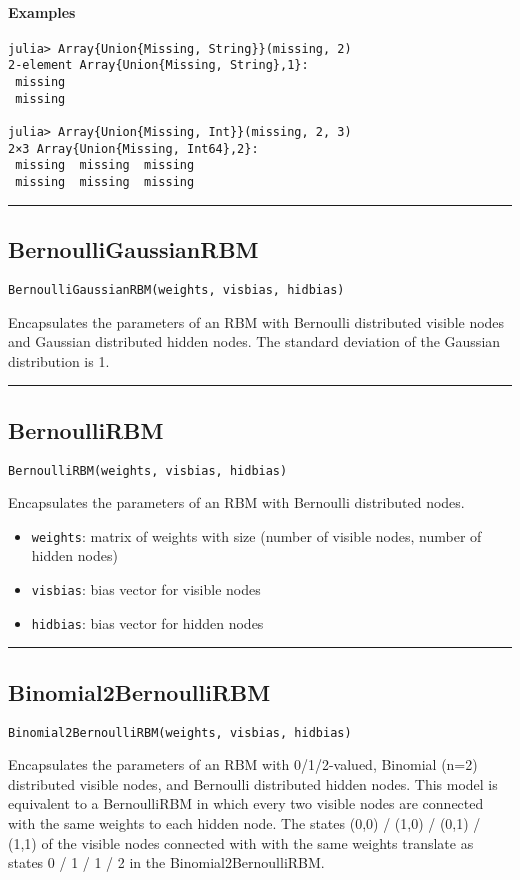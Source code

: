 \paragraph*{Examples}
\begin{verbatim}
julia> Array{Union{Missing, String}}(missing, 2)
2-element Array{Union{Missing, String},1}:
 missing
 missing

julia> Array{Union{Missing, Int}}(missing, 2, 3)
2×3 Array{Union{Missing, Int64},2}:
 missing  missing  missing
 missing  missing  missing
\end{verbatim}
\noindent\rule{\textwidth}{1pt}
\subsection*{BernoulliGaussianRBM}
\begin{verbatim}
BernoulliGaussianRBM(weights, visbias, hidbias)
\end{verbatim}
Encapsulates the parameters of an RBM with Bernoulli distributed visible nodes and Gaussian distributed hidden nodes. The standard deviation of the Gaussian distribution is 1.

\noindent\rule{\textwidth}{1pt}
\subsection*{BernoulliRBM}
\begin{verbatim}
BernoulliRBM(weights, visbias, hidbias)
\end{verbatim}
Encapsulates the parameters of an RBM with Bernoulli distributed nodes.

\begin{itemize}
\item \texttt{weights}: matrix of weights with size (number of visible nodes, number of hidden nodes)


\item \texttt{visbias}: bias vector for visible nodes


\item \texttt{hidbias}: bias vector for hidden nodes

\end{itemize}
\noindent\rule{\textwidth}{1pt}
\subsection*{Binomial2BernoulliRBM}
\begin{verbatim}
Binomial2BernoulliRBM(weights, visbias, hidbias)
\end{verbatim}
Encapsulates the parameters of an RBM with 0/1/2-valued, Binomial (n=2) distributed visible nodes, and Bernoulli distributed hidden nodes. This model is equivalent to a BernoulliRBM in which every two visible nodes are connected with the same weights to each hidden node. The states (0,0) / (1,0) / (0,1) / (1,1) of the visible nodes connected with with the same weights translate as states 0 / 1 / 1 / 2 in the Binomial2BernoulliRBM.

